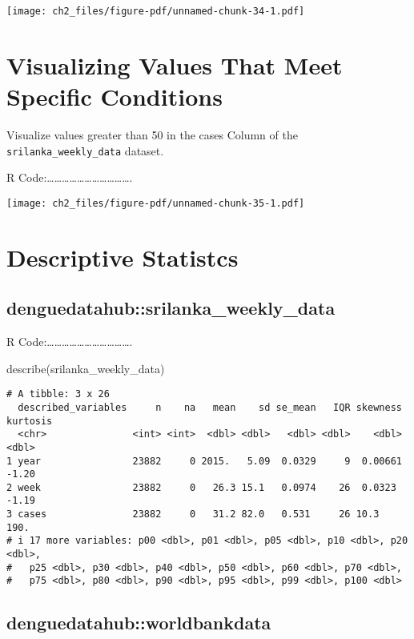 \documentclass[
  letterpaper,
  DIV=11,
  numbers=noendperiod]{scrreprt}
\newenvironment{Shaded}{\begin{snugshade}}{\end{snugshade}}
\newcommand{\FunctionTok}[1]{\textcolor[rgb]{0.28,0.35,0.67}{#1}}
\newcommand{\NormalTok}[1]{\textcolor[rgb]{0.00,0.23,0.31}{#1}}
\begin{document}
\texttt{[image: ch2\_files/figure-pdf/unnamed-chunk-34-1.pdf]}

\section{Visualizing Values That Meet Specific
Conditions}\label{visualizing-values-that-meet-specific-conditions}

Visualize values greater than 50 in the cases Column of the
\texttt{srilanka\_weekly\_data} dataset.

R
Code:\ldots\ldots\ldots\ldots\ldots\ldots\ldots\ldots\ldots\ldots\ldots.

\texttt{[image: ch2\_files/figure-pdf/unnamed-chunk-35-1.pdf]}

\section{Descriptive Statistcs}\label{descriptive-statistcs}

\subsection{denguedatahub::srilanka\_weekly\_data}\label{denguedatahubsrilanka_weekly_data-5}

R
Code:\ldots\ldots\ldots\ldots\ldots\ldots\ldots\ldots\ldots\ldots\ldots.

\begin{Shaded}
\begin{Highlighting}[]
\FunctionTok{describe}\NormalTok{(srilanka\_weekly\_data)}
\end{Highlighting}
\end{Shaded}

\begin{verbatim}
# A tibble: 3 x 26
  described_variables     n    na   mean    sd se_mean   IQR skewness kurtosis
  <chr>               <int> <int>  <dbl> <dbl>   <dbl> <dbl>    <dbl>    <dbl>
1 year                23882     0 2015.   5.09  0.0329     9  0.00661    -1.20
2 week                23882     0   26.3 15.1   0.0974    26  0.0323     -1.19
3 cases               23882     0   31.2 82.0   0.531     26 10.3       190.  
# i 17 more variables: p00 <dbl>, p01 <dbl>, p05 <dbl>, p10 <dbl>, p20 <dbl>,
#   p25 <dbl>, p30 <dbl>, p40 <dbl>, p50 <dbl>, p60 <dbl>, p70 <dbl>,
#   p75 <dbl>, p80 <dbl>, p90 <dbl>, p95 <dbl>, p99 <dbl>, p100 <dbl>
\end{verbatim}

\subsection{denguedatahub::worldbankdata}\label{denguedatahubworldbankdata}
\end{document}
